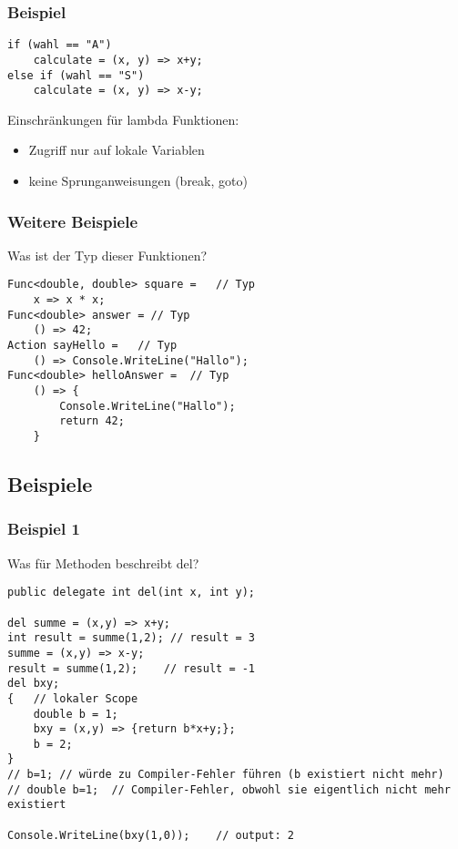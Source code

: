 \subsubsection*{Beispiel}
\begin{lstlisting}[language={[Sharp]C}]
if (wahl == "A")
	calculate = (x, y) => x+y;
else if (wahl == "S")
	calculate = (x, y) => x-y;
\end{lstlisting}

Einschränkungen für lambda Funktionen:
\begin{itemize}
\item Zugriff nur auf lokale Variablen
\item keine Sprunganweisungen (break, goto)
\end{itemize}

\subsubsection*{Weitere Beispiele}
Was ist der Typ dieser Funktionen? 
\begin{lstlisting}[language={[Sharp]C}]
Func<double, double> square =	// Typ
	x => x * x;
Func<double> answer = // Typ
	() => 42;
Action sayHello =	// Typ
	() => Console.WriteLine("Hallo");
Func<double> helloAnswer =	// Typ
	() => { 
		Console.WriteLine("Hallo");
		return 42;
	}
\end{lstlisting}

\subsection{Beispiele}
\subsubsection*{Beispiel 1}
Was für Methoden beschreibt del?
\begin{lstlisting}[language={[Sharp]C}]
public delegate int del(int x, int y);

del summe = (x,y) => x+y;
int result = summe(1,2); // result = 3
summe = (x,y) => x-y;
result = summe(1,2);	// result = -1
del bxy; 
{	// lokaler Scope 
	double b = 1;
	bxy = (x,y) => {return b*x+y;};
	b = 2;
}
// b=1; // würde zu Compiler-Fehler führen (b existiert nicht mehr)
// double b=1;	// Compiler-Fehler, obwohl sie eigentlich nicht mehr existiert

Console.WriteLine(bxy(1,0));	// output: 2
\end{lstlisting}

